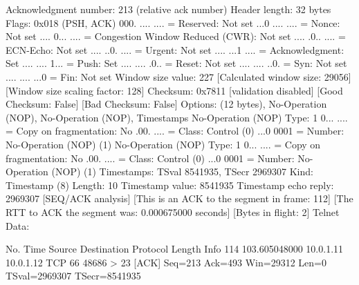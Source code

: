     Acknowledgment number: 213    (relative ack number)
    Header length: 32 bytes
    Flags: 0x018 (PSH, ACK)
        000. .... .... = Reserved: Not set
        ...0 .... .... = Nonce: Not set
        .... 0... .... = Congestion Window Reduced (CWR): Not set
        .... .0.. .... = ECN-Echo: Not set
        .... ..0. .... = Urgent: Not set
        .... ...1 .... = Acknowledgment: Set
        .... .... 1... = Push: Set
        .... .... .0.. = Reset: Not set
        .... .... ..0. = Syn: Not set
        .... .... ...0 = Fin: Not set
    Window size value: 227
    [Calculated window size: 29056]
    [Window size scaling factor: 128]
    Checksum: 0x7811 [validation disabled]
        [Good Checksum: False]
        [Bad Checksum: False]
    Options: (12 bytes), No-Operation (NOP), No-Operation (NOP), Timestamps
        No-Operation (NOP)
            Type: 1
                0... .... = Copy on fragmentation: No
                .00. .... = Class: Control (0)
                ...0 0001 = Number: No-Operation (NOP) (1)
        No-Operation (NOP)
            Type: 1
                0... .... = Copy on fragmentation: No
                .00. .... = Class: Control (0)
                ...0 0001 = Number: No-Operation (NOP) (1)
        Timestamps: TSval 8541935, TSecr 2969307
            Kind: Timestamp (8)
            Length: 10
            Timestamp value: 8541935
            Timestamp echo reply: 2969307
    [SEQ/ACK analysis]
        [This is an ACK to the segment in frame: 112]
        [The RTT to ACK the segment was: 0.000675000 seconds]
        [Bytes in flight: 2]
Telnet
    Data: 

No.     Time           Source                Destination           Protocol Length Info
    114 103.605048000  10.0.1.11             10.0.1.12             TCP      66     48686 > 23 [ACK] Seq=213 Ack=493 Win=29312 Len=0 TSval=2969307 TSecr=8541935

